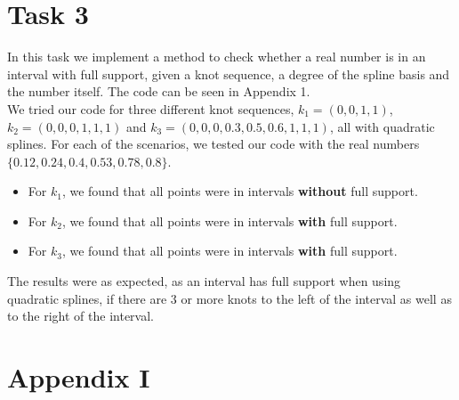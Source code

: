 \documentclass[]{article}
\begin{document}
\section*{Task 3}
In this task we implement a method to check whether a real number is in an interval with full support, given a knot sequence, a degree of the spline basis and the number itself. The code can be seen in Appendix 1. \\
We tried our code for three different knot sequences, $k_1=(0, 0, 1, 1)$, $k_2=(0, 0, 0, 1, 1, 1)$ and $k_3=(0, 0, 0, 0.3, 0.5, 0.6, 1, 1, 1)$, all with quadratic splines. For each of the scenarios, we tested our code with the real numbers $\{0.12, 0.24, 0.4, 0.53, 0.78, 0.8\}$.
\begin{itemize}
	\item For $k_1$, we found that all points were in intervals \textbf{without} full support.
	\item For $k_2$, we found that all points were in intervals \textbf{with} full support.
	\item For $k_3$, we found that all points were in intervals \textbf{with} full support.
\end{itemize}
The results were as expected, as an interval has full support when using quadratic splines, if there are 3 or more knots to the left of the interval as well as to the right of the interval.



\newpage
\section*{Appendix I}
%
\end{document}
